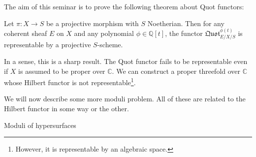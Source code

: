 \documentclass[ignorenonframetext,t]{beamer}
\newcommand{\C}{{\mathbb C}}
\newcommand{\Q}{{\mathbb Q}}
\theoremstyle{definition}
\begin{document}
The aim of this seminar is to prove the following theorem about Quot functors:

\begin{frame}
\begin{theorem}[Grothendieck]
	\label{theorem-quot-representable}
	Let $\pi: X\rightarrow S$ be a projective morphism with $S$ Noetherian. Then for any coherent sheaf $E$ on $X$ and any polynomial $\phi \in \Q[t]$, the functor $\mathfrak{Quot}^{\phi(t)}_{E/X/S}$ is representable by a projective $S$-scheme.
\end{theorem}
\end{frame}

In a sense, this is a sharp result. The Quot functor fails to be representable even if $X$ is assumed to be proper over $\C$. We can construct a proper threefold over $\C$ whose Hilbert functor is not representable\footnote{However, it is representable by an algebraic space.}.

We will now describe some more moduli problem. All of these are related to the Hilbert functor in some way or the other.

\begin{frame}
	Moduli of hypersurfaces
\end{frame}
\end{document}
